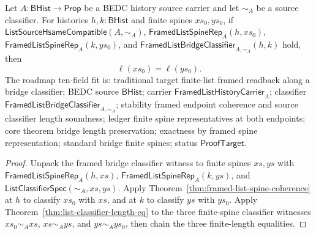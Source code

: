 \begin{theorem}
\label{thm:framed-list-bridge-classifier-represented-length}
Let $A:\mathsf{BHist}\to\mathsf{Prop}$ be a BEDC history source carrier and let
$\sim_A$ be a source classifier. For histories $h,k:\mathsf{BHist}$ and finite
spines $xs_0,ys_0$, if $\mathsf{ListSourceHsameCompatible}(A,\sim_A)$,
$\mathsf{FramedListSpineRep}_A(h,xs_0)$,
$\mathsf{FramedListSpineRep}_A(k,ys_0)$, and
$\mathsf{FramedListBridgeClassifier}_{A,\sim_A}(h,k)$ hold, then
$$
\ell(xs_0)=\ell(ys_0).
$$
The roadmap ten-field fit is: traditional target finite-list framed readback along a bridge classifier; BEDC source $\mathsf{BHist}$; carrier $\mathsf{FramedListHistoryCarrier}_A$; classifier $\mathsf{FramedListBridgeClassifier}_{A,\sim_A}$; stability framed endpoint coherence and source classifier length soundness; ledger finite spine representatives at both endpoints; core theorem bridge length preservation; exactness by framed spine representation; standard bridge finite spines; status $\mathsf{ProofTarget}$.
\end{theorem}
\begin{proof}
Unpack the framed bridge classifier witness to finite spines $xs,ys$ with
$\mathsf{FramedListSpineRep}_A(h,xs)$,
$\mathsf{FramedListSpineRep}_A(k,ys)$, and
$\mathsf{ListClassifierSpec}(\sim_A,xs,ys)$. Apply
Theorem~\ref{thm:framed-list-spine-coherence} at $h$ to classify $xs_0$ with
$xs$, and at $k$ to classify $ys$ with $ys_0$. Apply
Theorem~\ref{thm:list-classifier-length-eq} to the three finite-spine classifier
witnesses $xs_0\sim_A xs$, $xs\sim_A ys$, and $ys\sim_A ys_0$, then chain the
three finite-length equalities.
\end{proof}
